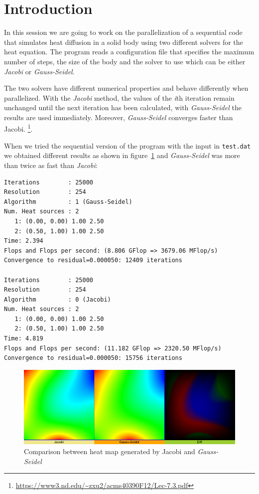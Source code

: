 \tableofcontents
\pagebreak

\section{Introduction}%
\label{sec:introduction}

In this session we are going to work on the parallelization of a sequential code that
simulates heat diffusion in a solid body using two different solvers for the heat equation.
The program reads a configuration file that specifies the maximum number of steps, the size
of the body and the solver to use which can be either \emph{Jacobi} or \emph{Gauss-Seidel}.

The two solvers have different numerical properties and behave differently when parallelized.
With the \emph{Jacobi} method, the values of the \emph{i}th iteration remain unchanged until
the next iteration has been calculated, with \emph{Gauss-Seidel} the results are used immediately.
Moreover, \emph{Gauss-Seidel} converges faster than Jacobi.
\footnote{\url{https://www3.nd.edu/~zxu2/acms40390F12/Lec-7.3.pdf}}.



When we tried the sequential version of the program with the input in \texttt{test.dat}
we obtained different results as shown in figure~\ref{fig:mosaic_label} and 
\emph{Gauss-Seidel} was more than twice as fast than \emph{Jacobi}:

\begin{verbatim}
Iterations        : 25000
Resolution        : 254
Algorithm         : 1 (Gauss-Seidel)
Num. Heat sources : 2
   1: (0.00, 0.00) 1.00 2.50 
   2: (0.50, 1.00) 1.00 2.50 
Time: 2.394 
Flops and Flops per second: (8.806 GFlop => 3679.06 MFlop/s)
Convergence to residual=0.000050: 12409 iterations

Iterations        : 25000
Resolution        : 254
Algorithm         : 0 (Jacobi)
Num. Heat sources : 2
   1: (0.00, 0.00) 1.00 2.50 
   2: (0.50, 1.00) 1.00 2.50 
Time: 4.819 
Flops and Flops per second: (11.182 GFlop => 2320.50 MFlop/s)
Convergence to residual=0.000050: 15756 iterations
\end{verbatim}


\begin{figure}[H]
    \centering
    \includegraphics[width=0.8\linewidth]{images/mosaic_label}
    \caption{Comparison between heat map generated by Jacobi and \emph{Gauss-Seidel}}%
    \label{fig:mosaic_label}
\end{figure}

